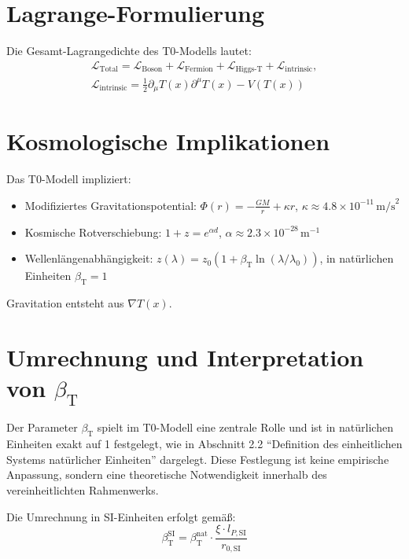 \documentclass[a4paper,12pt]{article}
\newcommand{\Tfield}{T(x)}
\newcommand{\betaT}{\beta_{\text{T}}}
\begin{document}
	\section{Lagrange-Formulierung}
	Die Gesamt-Lagrangedichte des T0-Modells lautet:
	\begin{multline}
		\mathcal{L}_{\text{Total}} = \mathcal{L}_{\text{Boson}} + \mathcal{L}_{\text{Fermion}} + \mathcal{L}_{\text{Higgs-T}} + \mathcal{L}_{\text{intrinsic}}, \\
		\mathcal{L}_{\text{intrinsic}} = \frac{1}{2} \partial_\mu \Tfield \partial^\mu \Tfield - V(\Tfield)
	\end{multline}
	
	\section{Kosmologische Implikationen}
	Das T0-Modell impliziert:
	\begin{itemize}
		\item Modifiziertes Gravitationspotential: \( \Phi(r) = -\frac{GM}{r} + \kappa r \), \( \kappa \approx 4.8 \times 10^{-11} \, \text{m/s}^2 \)
		\item Kosmische Rotverschiebung: \( 1 + z = e^{\alpha d} \), \( \alpha \approx 2.3 \times 10^{-28} \, \text{m}^{-1} \)
		\item Wellenlängenabhängigkeit: \( z(\lambda) = z_0 (1 + \betaT \ln(\lambda/\lambda_0)) \), in natürlichen Einheiten \(\betaT = 1\)
	\end{itemize}
	Gravitation entsteht aus \( \nabla \Tfield \).
	
\section{Umrechnung und Interpretation von \(\betaT\)}
\label{subsec:beta_conversion_interpretation}

Der Parameter \(\betaT\) spielt im T0-Modell eine zentrale Rolle und ist in natürlichen Einheiten exakt auf 1 festgelegt, wie in Abschnitt 2.2 ``Definition des einheitlichen Systems natürlicher Einheiten'' dargelegt. Diese Festlegung ist keine empirische Anpassung, sondern eine theoretische Notwendigkeit innerhalb des vereinheitlichten Rahmenwerks.

Die Umrechnung in SI-Einheiten erfolgt gemäß:
\begin{equation}
	\betaT^{\text{SI}} = \betaT^{\text{nat}} \cdot \frac{\xi \cdot l_{P,\text{SI}}}{r_{0,\text{SI}}}
\end{equation}
\end{document}
